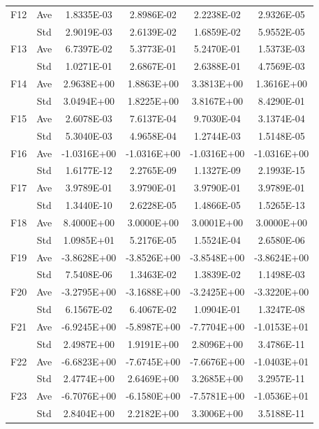 \documentclass[11pt]{article}
\begin{document}
\begin{table}[htbp]
{\begin{tabular}{cccccc}
F12 & Ave & 1.8335E-03 & 2.8986E-02 & 2.2238E-02 & 2.9326E-05 \\
    & Std & 2.9019E-03 & 2.6139E-02 & 1.6859E-02 & 5.9552E-05 \\
F13 & Ave & 6.7397E-02 & 5.3773E-01 & 5.2470E-01 & 1.5373E-03 \\
    & Std & 1.0271E-01 & 2.6867E-01 & 2.6388E-01 & 4.7569E-03 \\
F14 & Ave & 2.9638E+00 & 1.8863E+00 & 3.3813E+00 & 1.3616E+00 \\
    & Std & 3.0494E+00 & 1.8225E+00 & 3.8167E+00 & 8.4290E-01 \\
F15 & Ave & 2.6078E-03 & 7.6137E-04 & 9.7030E-04 & 3.1374E-04 \\
    & Std & 5.3040E-03 & 4.9658E-04 & 1.2744E-03 & 1.5148E-05 \\
F16 & Ave & -1.0316E+00 & -1.0316E+00 & -1.0316E+00 & -1.0316E+00 \\
    & Std & 1.6177E-12 & 2.2765E-09 & 1.1327E-09 & 2.1993E-15 \\
F17 & Ave & 3.9789E-01 & 3.9790E-01 & 3.9790E-01 & 3.9789E-01 \\
    & Std & 1.3440E-10 & 2.6228E-05 & 1.4866E-05 & 1.5265E-13 \\
F18 & Ave & 8.4000E+00 & 3.0000E+00 & 3.0001E+00 & 3.0000E+00 \\
    & Std & 1.0985E+01 & 5.2176E-05 & 1.5524E-04 & 2.6580E-06 \\
F19 & Ave & -3.8628E+00 & -3.8526E+00 & -3.8548E+00 & -3.8624E+00 \\
    & Std & 7.5408E-06 & 1.3463E-02 & 1.3839E-02 & 1.1498E-03 \\
F20 & Ave & -3.2795E+00 & -3.1688E+00 & -3.2425E+00 & -3.3220E+00 \\
    & Std & 6.1567E-02 & 6.4067E-02 & 1.0904E-01 & 1.3247E-08 \\
F21 & Ave & -6.9245E+00 & -5.8987E+00 & -7.7704E+00 & -1.0153E+01 \\
    & Std & 2.4987E+00 & 1.9191E+00 & 2.8096E+00 & 3.4786E-11 \\
F22 & Ave & -6.6823E+00 & -7.6745E+00 & -7.6676E+00 & -1.0403E+01 \\
    & Std & 2.4774E+00 & 2.6469E+00 & 3.2685E+00 & 3.2957E-11 \\
F23 & Ave & -6.7076E+00 & -6.1580E+00 & -7.5781E+00 & -1.0536E+01 \\
    & Std & 2.8404E+00 & 2.2182E+00 & 3.3006E+00 & 3.5188E-11 \\
\hline
\end{tabular}
}
\end{table}
\end{document}
